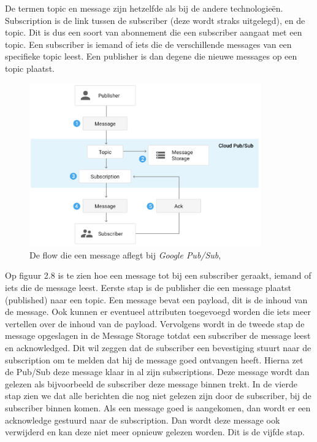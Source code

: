 De termen topic en message zijn hetzelfde als bij de andere technologieën. Subscription is de link tussen de subscriber (deze wordt straks uitgelegd), en de topic. Dit is dus een soort van abonnement die een subscriber aangaat met een topic. Een subscriber is iemand of iets die de verschillende messages van een specifieke topic leest. Een publisher is dan degene die nieuwe messages op een topic plaatst.

 \begin{figure}[h!]
    \centering
    \includegraphics[width=100mm]{../gpsFlow.png}
    \caption{De flow die een message aflegt bij \emph{Google Pub/Sub}, \autocite{Google2019}}
    
\end{figure}

Op figuur 2.8 is te zien hoe een message tot bij een subscriber geraakt, iemand of iets die de message leest. Eerste stap is de publisher die een message plaatst (published) naar een topic. Een message bevat een payload, dit is de inhoud van de message. Ook kunnen er eventueel attributen toegevoegd worden die iets meer vertellen over de inhoud van de payload. Vervolgens wordt in de tweede stap de message opgeslagen in de Message Storage totdat een subscriber de message leest en acknowledged. Dit wil zeggen dat de subscriber een bevestiging stuurt naar de subscription om te melden dat hij de message goed ontvangen heeft. Hierna zet de Pub/Sub deze message klaar in al zijn subscriptions. Deze message wordt dan gelezen als bijvoorbeeld de subscriber deze message binnen trekt. In de vierde stap zien we dat alle berichten die nog niet gelezen zijn door de subscriber, bij de subscriber binnen komen. Als een message goed is aangekomen, dan wordt er een acknowledge gestuurd naar de subscription. Dan wordt deze message ook verwijderd en kan deze niet meer opnieuw gelezen worden. Dit is de vijfde stap.

